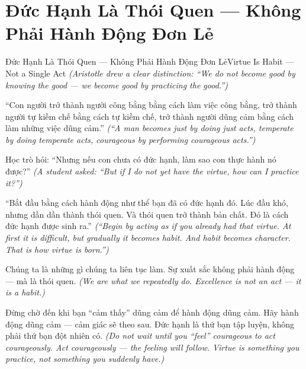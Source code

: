 \section{Đức Hạnh Là Thói Quen — Không Phải Hành Động Đơn Lẻ}
\begin{truyen}{Đức Hạnh Là Thói Quen — Không Phải Hành Động Đơn Lẻ}{Virtue Is Habit — Not a Single Act}
\textit{(Aristotle drew a clear distinction: ``We do not become good by knowing the good — we become good by practicing the good.'')}

``Con người trở thành người công bằng bằng cách làm việc công bằng, trở thành người tự kiềm chế bằng cách tự kiềm chế, trở thành người dũng cảm bằng cách làm những việc dũng cảm.''
\textit{(``A man becomes just by doing just acts, temperate by doing temperate acts, courageous by performing courageous acts.'')}

Học trò hỏi: ``Nhưng nếu con chưa có đức hạnh, làm sao con thực hành nó được?''
\textit{(A student asked: ``But if I do not yet have the virtue, how can I practice it?'')}

``Bắt đầu bằng cách hành động như thể bạn đã có đức hạnh đó. Lúc đầu khó, nhưng dần dần thành thói quen. Và thói quen trở thành bản chất. Đó là cách đức hạnh được sinh ra.''
\textit{(``Begin by acting as if you already had that virtue. At first it is difficult, but gradually it becomes habit. And habit becomes character. That is how virtue is born.'')}

Chúng ta là những gì chúng ta liên tục làm. Sự xuất sắc không phải hành động — mà là thói quen.
\textit{(We are what we repeatedly do. Excellence is not an act — it is a habit.)}

\end{truyen}

\begin{baihoc}
Đừng chờ đến khi bạn ``cảm thấy'' dũng cảm để hành động dũng cảm. Hãy hành động dũng cảm — cảm giác sẽ theo sau. Đức hạnh là thứ bạn tập luyện, không phải thứ bạn đột nhiên có.
\textit{(Do not wait until you ``feel'' courageous to act courageously. Act courageously — the feeling will follow. Virtue is something you practice, not something you suddenly have.)}
\end{baihoc}
\ngancach

